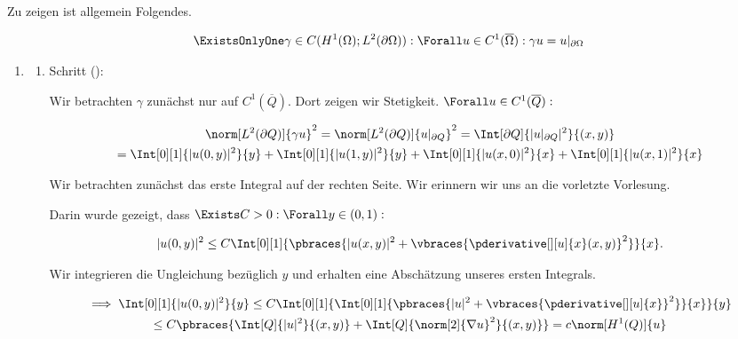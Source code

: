 \begin{solution}

Zu zeigen ist allgemein Folgendes.

\begin{align*}
  \ExistsOnlyOne \gamma \in C
  (
    H^1(\Omega);
    L^2(\partial \Omega)
  ):
  \Forall u \in C^1(\overline{\Omega}):
  \gamma u = u|_{\partial \Omega}
\end{align*}

\begin{enumerate}[label = \textbf{\alph*)}]

  \item

  \begin{enumerate}[label = \arabic*.]

    \item Schritt ():

    Wir betrachten $\gamma$ zunächst nur auf $C^1(\overline{Q})$.
    Dort zeigen wir Stetigkeit.
    $\Forall u \in C^1(\overline{Q}):$

    \begin{multline*}
      \norm[L^2(\partial Q)]{\gamma u}^2
      =
      \norm[L^2(\partial Q)]{u|_{\partial Q}}^2
      =
      \Int[\partial Q]{|u|_{\partial Q}|^2}{(x, y)} \\
      =
      \Int[0][1]{|u(0, y)|^2}{y}
      +
      \Int[0][1]{|u(1, y)|^2}{y}
      +
      \Int[0][1]{|u(x, 0)|^2}{x}
      +
      \Int[0][1]{|u(x, 1)|^2}{x}
    \end{multline*}

    Wir betrachten zunächst das erste Integral auf der rechten Seite.
    Wir erinnern wir uns an die vorletzte Vorlesung.


    Darin wurde gezeigt, dass $\Exists C > 0: \Forall y \in (0, 1):$

    \begin{align*}
      |u(0, y)|^2
      \leq
      C\Int[0][1]
      {
        \pbraces
        {
          |u(x, y)|^2
          +
          \vbraces
          {
            \pderivative[][u]{x}(x, y)
          }^2
        }
      }{x}.
    \end{align*}

    Wir integrieren die Ungleichung bezüglich $y$ und erhalten eine Abschätzung unseres ersten Integrals.

    \begin{multline*}
      \implies
      \Int[0][1]{|u(0, y)|^2}{y}
      \leq
      C
      \Int[0][1]
      {
        \Int[0][1]
        {
          \pbraces
          {
            |u|^2
            +
            \vbraces
            {
              \pderivative[][u]{x}
            }^2
          }
        }{x}
      }{y} \\
      \leq
      C
      \pbraces
      {
        \Int[Q]{|u|^2}{(x, y)}
        +
        \Int[Q]{\norm[2]{\nabla u}^2}{(x, y)}
      }
      =
      c \norm[H^1(Q)]{u}
    \end{multline*}


\end{enumerate}
\end{enumerate}
\end{solution}
